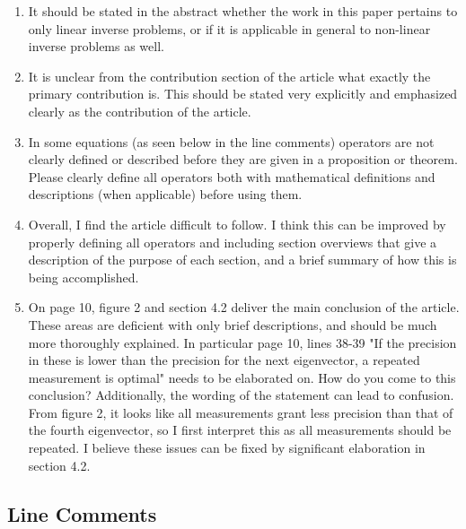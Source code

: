 \documentclass{amsart}
\begin{document}
\begin{enumerate}
\item It should be stated in the abstract whether the work in this
  paper pertains to only linear inverse problems, or if it is
  applicable in general to non-linear inverse problems as well.
  
\item It is unclear from the contribution section of the article what
exactly the primary contribution is. This should be stated very
explicitly and emphasized clearly as the contribution of the article.
  
\item In some equations (as seen below in the line comments) operators
are not clearly defined or described before they are given in a
proposition or theorem. Please clearly define all operators both with
mathematical definitions and descriptions (when applicable) before
using them.

\item Overall, I find the article difficult to follow. I think this can
be improved by properly defining all operators and including section
overviews that give a description of the purpose of each section, and
a brief summary of how this is being accomplished.


\item On page 10, figure 2 and section 4.2 deliver the main conclusion of
the article. These areas are deficient with only brief descriptions,
and should be much more thoroughly explained. In particular page 10,
lines 38-39 "If the precision in these is lower than the precision for
the next eigenvector, a repeated measurement is optimal" needs to be
elaborated on. How do you come to this conclusion? Additionally, the
wording of the statement can lead to confusion. From figure 2, it
looks like all measurements grant less precision than that of the
fourth eigenvector, so I first interpret this as all measurements
should be repeated. I believe these issues can be fixed by significant
elaboration in section 4.2.
\end{enumerate}


\subsection{Line Comments}
\end{document}
